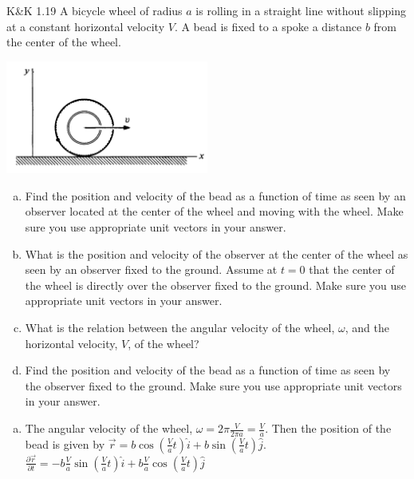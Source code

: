 \documentclass{esg8012pset}
\begin{document}
\begin{question}[Problem 2]
\begin{solution}
\begin{enumerate}[a.]
  \end{enumerate}
\end{solution}

\begin{problem}{K\&K 1.19}
  A bicycle wheel of radius $a$ is rolling in a straight line without slipping at a constant horizontal
  velocity $V$. A bead is fixed to a spoke a distance $b$ from the center of the wheel.
  \begin{center}\includegraphics[width=0.5\textwidth]{ps01_3}\end{center}
  \begin{enumerate}[a)]
    \item Find the position and velocity of the bead as a function of time as seen by an observer located
  at the center of the wheel and moving with the wheel. Make sure you use appropriate unit
  vectors in your answer.
    \item What is the position and velocity of the observer at the center of the wheel as seen by an
  observer fixed to the ground. Assume at $t = 0$ that the center of the wheel is directly over the
  observer fixed to the ground. Make sure you use appropriate unit vectors in your answer.
    \item What is the relation between the angular velocity of the wheel, $\omega$, and the horizontal velocity, $V$, of the wheel?
    \item Find the position and velocity of the bead as a function of time as seen by the observer fixed
  to the ground. Make sure you use appropriate unit vectors in your answer.
  \end{enumerate}
\end{problem}
\begin{solution}
  \begin{enumerate}[a)]
    \item The angular velocity of the wheel, $\omega = 2\pi \frac{V}{2\pi a} = \frac{V}{a}$.  Then the position of the bead is given by $\vec r = b\cos\left(\frac{V}{a}t\right)\hat i + b\sin\left(\frac{V}{a}t\right)\hat j$.  $\frac{\partial \vec r}{\partial t} = -b\frac{V}{a}\sin\left(\frac{V}{a}t\right)\hat i + b\frac{V}{a}\cos\left(\frac{V}{a}t\right)\hat j$

\end{enumerate}
\end{solution}
\end{question}
\end{document}
